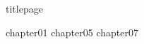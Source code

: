 \documentclass[
	,a4paper
	,12pt
	,oneside
]{book}
\begin{document}
\frontmatter
	{titlepage}
	\restoregeometry
	\tableofcontents

\mainmatter

	{chapter01}
	{chapter05}
	{chapter07}


\backmatter
\end{document}
